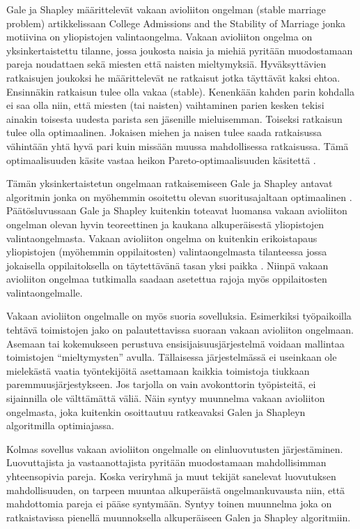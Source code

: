 \documentclass[gradu, twoside]{tktltiki}
\begin{document}
Gale ja Shapley määrittelevät vakaan avioliiton ongelman (stable
marriage problem) artikkelissaan College Admissions and the Stability
of Marriage \cite{galeshapley62} jonka motiivina on yliopistojen
valintaongelma. Vakaan avioliiton ongelma on yksinkertaistettu
tilanne, jossa joukosta naisia ja miehiä pyritään muodostamaan pareja
noudattaen sekä miesten että naisten mieltymyksiä. Hyväksyttävien
ratkaisujen joukoksi he määrittelevät ne ratkaisut jotka täyttävät
kaksi ehtoa. Ensinnäkin ratkaisun tulee olla vakaa (stable). Kenenkään
kahden parin kohdalla ei saa olla niin, että miesten (tai naisten)
vaihtaminen parien kesken tekisi ainakin toisesta uudesta parista sen
jäsenille mieluisemman. Toiseksi ratkaisun tulee olla optimaalinen.
Jokaisen miehen ja naisen tulee saada ratkaisussa vähintään yhtä hyvä
pari kuin missään muussa mahdollisessa ratkaisussa. Tämä
optimaalisuuden käsite vastaa heikon Pareto-optimaalisuuden käsitettä
\cite{gusfield89}.

Tämän yksinkertaistetun ongelmaan ratkaisemiseen Gale ja Shapley
antavat algoritmin jonka on myöhemmin osoitettu olevan
suoritusajaltaan optimaalinen \cite{gusfield89, cheng89}.
Päätösluvussaan Gale ja Shapley kuitenkin toteavat luomansa vakaan
avioliiton ongelman olevan hyvin teoreettinen ja kaukana
alkuperäisestä yliopistojen valintaongelmasta. Vakaan avioliiton
ongelma on kuitenkin erikoistapaus yliopistojen (myöhemmin
oppilaitosten) valintaongelmasta tilanteessa jossa jokaisella
oppilaitoksella on täytettävänä tasan yksi paikka \cite{manlove02}.
Niinpä vakaan avioliiton ongelmaa tutkimalla saadaan asetettua rajoja
myös oppilaitosten valintaongelmalle.

Vakaan avioliiton ongelmalle on myös suoria sovelluksia. Esimerkiksi
työpaikoilla tehtävä toimistojen jako on palautettavissa suoraan
vakaan avioliiton ongelmaan. Asemaan tai kokemukseen perustuva
ensisijaisuusjärjestelmä voidaan mallintaa toimistojen
``mieltymysten'' avulla. Tällaisessa järjestelmässä ei useinkaan ole
mielekästä vaatia työntekijöitä asettamaan kaikkia toimistoja tiukkaan
paremmuusjärjestykseen. Jos tarjolla on vain avokonttorin työpisteitä,
ei sijainnilla ole välttämättä väliä. Näin syntyy muunnelma vakaan
avioliiton ongelmasta, joka kuitenkin osoittautuu ratkeavaksi Galen ja
Shapleyn algoritmilla optimiajassa.

Kolmas sovellus vakaan avioliiton ongelmalle on elinluovutusten
järjestäminen. Luovuttajista ja vastaanottajista pyritään muodostamaan
mahdollisimman yhteensopivia pareja. Koska veriryhmä ja muut tekijät
sanelevat luovutuksen mahdollisuuden, on tarpeen muuntaa alkuperäistä
ongelmankuvausta niin, että mahdottomia pareja ei pääse syntymään.
Syntyy toinen muunnelma joka on ratkaistavissa pienellä muunnoksella
alkuperäiseen Galen ja Shapley algoritmiin.
\end{document}
